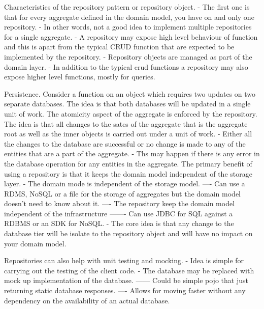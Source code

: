 \documentclass[a4paper, 11pt]{book}
\begin{document}
    Characteristics of the repository pattern or repository object.
    - The first one is that for every aggregate defined in the domain model, you have on and only one repository.
    - In other words, not a good idea to implement multiple repositories for a single aggregate.
    - A repository may expose high level behaviour of function and this is apart from the typical CRUD function that are expected to be implemented by the repository.
    - Repository objects are managed as part of the domain layer.
    - In addition to the typical crud functions a repository may also expose higher level functions, mostly for queries.


    Persistence.
    Consider a function on an object which requires two updates on two separate databases.
    The idea is that both databases will be updated in a single unit of work.
    The atomicity aspect of the aggregate is enforced by the repository.
    The idea is that all changes to the sates of the aggregate that is the aggregate root as well as the inner objects is carried out under a unit of work.
    - Either all the changes to the database are successful or no change is made to any of the entities that are a part of the aggregate.
    - Ths may happen if there is any error in the database operation for any entities in the aggregate.
    The primary benefit of using a repository is that it keeps the domain model independent of the storage layer.
    - The domain mode is independent of the storage model.
    ---- Can use a RDMS, NoSQL or a file for the storage of aggregates but the domain model doesn't need to know about it.
    ---- The repository keep the domain model independent of the infrastructure
    ------- Can use JDBC for SQL against a RDBMS or an SDK for NoSQL.
    - The core idea is that any change to the database tier will be isolate to the repository object and will have no impact on your domain model.

    Repositories can also help with unit testing and mocking.
    - Idea is simple for carrying out the testing of the client code.
    - The database may be replaced with mock up implementation of the database.
    ------ Could be simple pojo that just returning static database responses.
    ---- Allows for moving faster without any dependency on the availability of an actual database.
\end{document}
